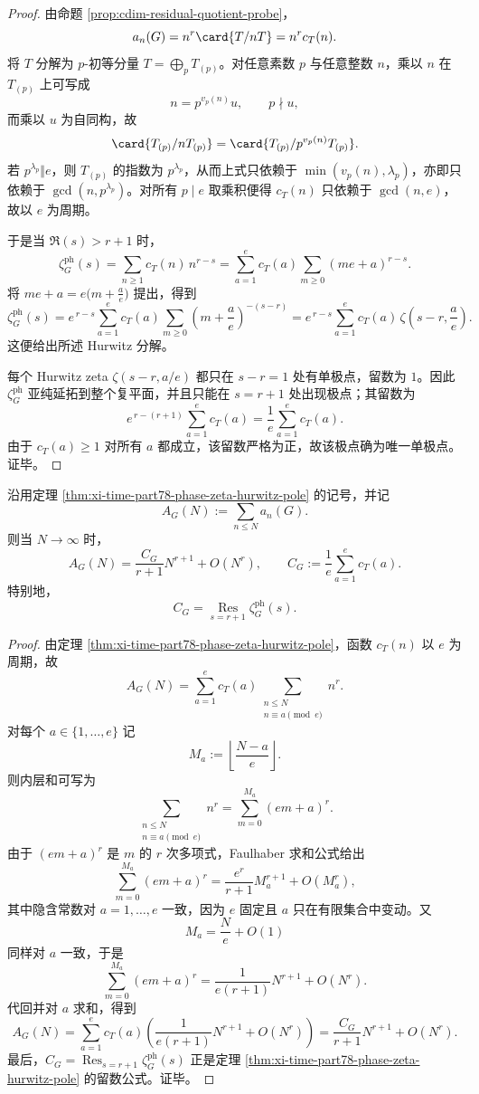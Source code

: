 \begin{proof}
由命题 \ref{prop:cdim-residual-quotient-probe}，
\[
a_n(G)=n^r\card{T/nT}=n^r c_T(n).
\]
将 \(T\) 分解为 \(p\)-初等分量 \(T=\bigoplus_p T_{(p)}\)。对任意素数 \(p\) 与任意整数 \(n\)，乘以 \(n\) 在 \(T_{(p)}\) 上可写成
\[
n=p^{v_p(n)}u,\qquad p\nmid u,
\]
而乘以 \(u\) 为自同构，故
\[
\card{T_{(p)}/nT_{(p)}}=\card{T_{(p)}/p^{v_p(n)}T_{(p)}}.
\]
若 \(p^{\lambda_p}\Vert e\)，则 \(T_{(p)}\) 的指数为 \(p^{\lambda_p}\)，从而上式只依赖于 \(\min(v_p(n),\lambda_p)\)，亦即只依赖于 \(\gcd(n,p^{\lambda_p})\)。对所有 \(p\mid e\) 取乘积便得 \(c_T(n)\) 只依赖于 \(\gcd(n,e)\)，故以 \(e\) 为周期。

于是当 \(\Re(s)>r+1\) 时，
\[
\zeta_G^{\mathrm{ph}}(s)
=\sum_{n\ge 1}c_T(n)\,n^{r-s}
=\sum_{a=1}^{e}c_T(a)\sum_{m\ge 0}(me+a)^{r-s}.
\]
将 \(me+a=e\bigl(m+\frac{a}{e}\bigr)\) 提出，得到
\[
\zeta_G^{\mathrm{ph}}(s)
=e^{\,r-s}\sum_{a=1}^{e}c_T(a)\sum_{m\ge 0}\left(m+\frac{a}{e}\right)^{-(s-r)}
=e^{\,r-s}\sum_{a=1}^{e}c_T(a)\,\zeta\!\left(s-r,\frac{a}{e}\right).
\]
这便给出所述 Hurwitz 分解。

每个 Hurwitz zeta \(\zeta(s-r,a/e)\) 都只在 \(s-r=1\) 处有单极点，留数为 \(1\)。因此 \(\zeta_G^{\mathrm{ph}}\) 亚纯延拓到整个复平面，并且只能在 \(s=r+1\) 处出现极点；其留数为
\[
e^{\,r-(r+1)}\sum_{a=1}^{e}c_T(a)=\frac1e\sum_{a=1}^{e}c_T(a).
\]
由于 \(c_T(a)\ge 1\) 对所有 \(a\) 都成立，该留数严格为正，故该极点确为唯一单极点。证毕。
\end{proof}

\begin{theorem}\label{thm:xi-time-part78-phase-zeta-partial-sum-sharp}
沿用定理 \ref{thm:xi-time-part78-phase-zeta-hurwitz-pole} 的记号，并记
\[
A_G(N):=\sum_{n\le N}a_n(G).
\]
则当 \(N\to\infty\) 时，
\[
A_G(N)=\frac{C_G}{r+1}N^{r+1}+O(N^r),
\qquad
C_G:=\frac1e\sum_{a=1}^{e}c_T(a).
\]
特别地，
\[
C_G=\operatorname*{Res}_{s=r+1}\zeta_G^{\mathrm{ph}}(s).
\]
\end{theorem}
\begin{proof}
由定理 \ref{thm:xi-time-part78-phase-zeta-hurwitz-pole}，函数 \(c_T(n)\) 以 \(e\) 为周期，故
\[
A_G(N)
=\sum_{a=1}^{e}c_T(a)\sum_{\substack{n\le N\\ n\equiv a\!\!\!\pmod e}}n^r.
\]
对每个 \(a\in\{1,\dots,e\}\) 记
\[
M_a:=\left\lfloor\frac{N-a}{e}\right\rfloor.
\]
则内层和可写为
\[
\sum_{\substack{n\le N\\ n\equiv a\!\!\!\pmod e}}n^r
=\sum_{m=0}^{M_a}(em+a)^r.
\]
由于 \((em+a)^r\) 是 \(m\) 的 \(r\) 次多项式，Faulhaber 求和公式给出
\[
\sum_{m=0}^{M_a}(em+a)^r
=\frac{e^r}{r+1}M_a^{r+1}+O(M_a^r),
\]
其中隐含常数对 \(a=1,\dots,e\) 一致，因为 \(e\) 固定且 \(a\) 只在有限集合中变动。又
\[
M_a=\frac{N}{e}+O(1)
\]
同样对 \(a\) 一致，于是
\[
\sum_{m=0}^{M_a}(em+a)^r
=\frac{1}{e(r+1)}N^{r+1}+O(N^r).
\]
代回并对 \(a\) 求和，得到
\[
A_G(N)
=\sum_{a=1}^{e}c_T(a)\left(\frac{1}{e(r+1)}N^{r+1}+O(N^r)\right)
=\frac{C_G}{r+1}N^{r+1}+O(N^r).
\]
最后，\(C_G=\operatorname*{Res}_{s=r+1}\zeta_G^{\mathrm{ph}}(s)\) 正是定理 \ref{thm:xi-time-part78-phase-zeta-hurwitz-pole} 的留数公式。证毕。
\end{proof}

